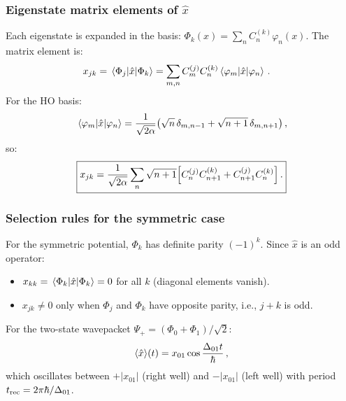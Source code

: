 \subsubsection{Eigenstate matrix elements of $\hat{x}$}

Each eigenstate is expanded in the basis: $\Phi_k(x) = \sum_n C_{n}^{(k)}\varphi_n(x)$.
The matrix element is:
\begin{align}
  x_{jk} &= \mel{\Phi_j}{\hat{x}}{\Phi_k}
  = \sum_{m,n}C_m^{(j)}C_n^{(k)}\mel{\varphi_m}{\hat{x}}{\varphi_n}\,.
\end{align}
For the HO basis:
\begin{equation}
  \mel{\varphi_m}{\hat{x}}{\varphi_n} = \frac{1}{\sqrt{2\alpha}}\bigl(\sqrt{n}\,\delta_{m,n-1}+\sqrt{n+1}\,\delta_{m,n+1}\bigr)\,,
\end{equation}
so:
\begin{equation}\label{eq:xjk_HO}
  \boxed{x_{jk} = \frac{1}{\sqrt{2\alpha}}\sum_n \sqrt{n+1}\Bigl[C_n^{(j)}C_{n+1}^{(k)} + C_{n+1}^{(j)}C_n^{(k)}\Bigr]\,.}
\end{equation}

\subsubsection{Selection rules for the symmetric case}

For the symmetric potential, $\Phi_k$ has definite parity $(-1)^k$.
Since $\hat{x}$ is an odd operator:
\begin{itemize}
  \item $x_{kk} = \mel{\Phi_k}{\hat{x}}{\Phi_k} = 0$ for all $k$ (diagonal elements vanish).
  \item $x_{jk} \neq 0$ only when $\Phi_j$ and $\Phi_k$ have opposite parity, i.e., $j+k$ is odd.
\end{itemize}

For the two-state wavepacket $\Psi_+ = (\Phi_0 + \Phi_1)/\sqrt{2}$:
\begin{equation}
  \langle\hat{x}\rangle(t) = x_{01}\cos\frac{\Delta_{01}t}{\hbar}\,,
\end{equation}
which oscillates between $+|x_{01}|$ (right well) and $-|x_{01}|$ (left well) with
period $t_{\text{rec}} = 2\pi\hbar/\Delta_{01}$.

